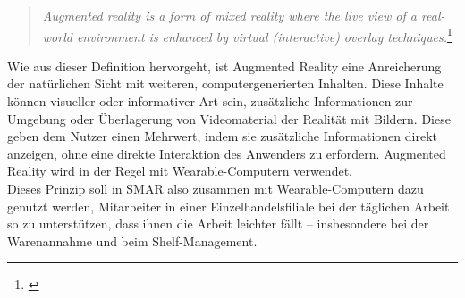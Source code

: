 \begin{quote}
\glqq \textit{Augmented reality is a form of mixed reality where the live view of a real-world environment is enhanced by virtual (interactive) overlay techniques.}\grqq \footnote{\citep{augmented_reality}}
\end{quote}

Wie aus dieser Definition hervorgeht, ist Augmented Reality eine Anreicherung der natürlichen Sicht mit weiteren, computergenerierten Inhalten. Diese Inhalte können visueller oder informativer Art sein, \zB zusätzliche Informationen zur Umgebung oder Überlagerung von Videomaterial der Realität mit Bildern. Diese geben dem Nutzer einen Mehrwert, indem sie zusätzliche Informationen direkt anzeigen, ohne eine direkte Interaktion des Anwenders zu erfordern. Augmented Reality wird in der Regel mit Wearable-Computern verwendet.
\\
Dieses Prinzip soll in \acs{SMAR} also zusammen mit Wearable-Computern dazu genutzt werden, Mitarbeiter in einer Einzelhandelsfiliale bei der täglichen Arbeit so zu unterstützen, dass ihnen die Arbeit leichter fällt -- insbesondere bei der Warenannahme und beim Shelf-Management. 